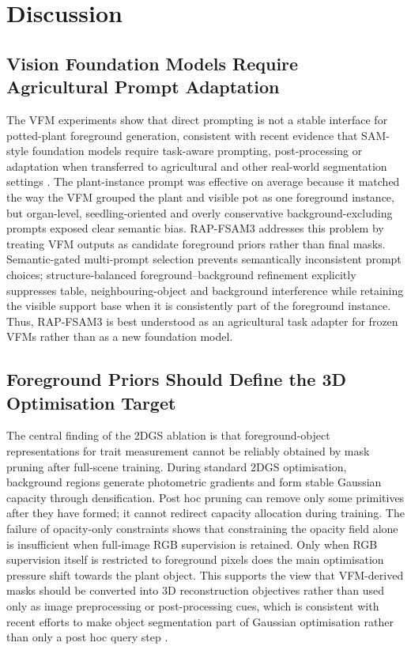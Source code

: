 \documentclass[a4paper]{cas-sc}
\begin{document}
\FloatBarrier

\section{Discussion}\label{sec:discussion}

\subsection{Vision Foundation Models Require Agricultural Prompt Adaptation}\label{sec:vfm-prompt-adaptation}

The VFM experiments show that direct prompting is not a stable interface for potted-plant foreground generation, consistent with recent evidence that SAM-style foundation models require task-aware prompting, post-processing or adaptation when transferred to agricultural and other real-world segmentation settings \cite{ref65,ref66,ref67}. The plant-instance prompt was effective on average because it matched the way the VFM grouped the plant and visible pot as one foreground instance, but organ-level, seedling-oriented and overly conservative background-excluding prompts exposed clear semantic bias. RAP-FSAM3 addresses this problem by treating VFM outputs as candidate foreground priors rather than final masks. Semantic-gated multi-prompt selection prevents semantically inconsistent prompt choices; structure-balanced foreground--background refinement explicitly suppresses table, neighbouring-object and background interference while retaining the visible support base when it is consistently part of the foreground instance. Thus, RAP-FSAM3 is best understood as an agricultural task adapter for frozen VFMs rather than as a new foundation model.

\subsection{Foreground Priors Should Define the 3D Optimisation Target}\label{sec:vfm-priors-to-3d-objective}

The central finding of the 2DGS ablation is that foreground-object representations for trait measurement cannot be reliably obtained by mask pruning after full-scene training. During standard 2DGS optimisation, background regions generate photometric gradients and form stable Gaussian capacity through densification. Post hoc pruning can remove only some primitives after they have formed; it cannot redirect capacity allocation during training. The failure of opacity-only constraints shows that constraining the opacity field alone is insufficient when full-image RGB supervision is retained. Only when RGB supervision itself is restricted to foreground pixels does the main optimisation pressure shift towards the plant object. This supports the view that VFM-derived masks should be converted into 3D reconstruction objectives rather than used only as image preprocessing or post-processing cues, which is consistent with recent efforts to make object segmentation part of Gaussian optimisation rather than only a post hoc query step \cite{ref70}.
\end{document}
